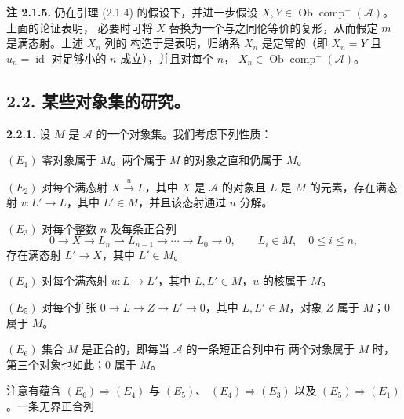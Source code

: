 \clearpage
{}%
\begingroup\small\setlength{\parskip}{0pt}\setlength{\emergencystretch}{1.5em}
\setlength{\abovedisplayskip}{4pt plus 2pt minus 2pt}%
\setlength{\belowdisplayskip}{4pt plus 2pt minus 2pt}%

\noindent\textbf{注 2.1.5.}\quad
仍在引理 (2.1.4) 的假设下，并进一步假设
$X,Y\in\operatorname{Ob}\operatorname{comp}^{-}(\mathcal A)$。上面的论证表明，
必要时可将 $X$ 替换为一个与之同伦等价的复形，从而假定 $m$ 是满态射。上述 $X_n$ 列的
构造于是表明，归纳系 $X_n$ 是定常的（即 $X_n=Y$ 且
$u_n=\operatorname{id}$ 对足够小的 $n$ 成立），并且对每个 $n$，
$X_n\in\operatorname{Ob}\operatorname{comp}^{-}(\mathcal A)$。

\subsection*{2.2. 某些对象集的研究。}

\noindent\textbf{2.2.1.}\quad
设 $M$ 是 $\mathcal A$ 的一个对象集。我们考虑下列性质：

\noindent $(E_1)$ 零对象属于 $M$。两个属于 $M$ 的对象之直和仍属于 $M$。

\noindent $(E_2)$ 对每个满态射 $X\xrightarrow{u}L$，其中 $X$ 是
$\mathcal A$ 的对象且 $L$ 是 $M$ 的元素，存在满态射
$v\colon L'\longrightarrow L$，其中 $L'\in M$，并且该态射通过 $u$ 分解。

\noindent $(E_3)$ 对每个整数 $n$ 及每条正合列
\[
0\longrightarrow X\longrightarrow L_n\longrightarrow L_{n-1}
\longrightarrow\cdots\longrightarrow L_0\longrightarrow0,
\qquad L_i\in M,\quad 0\le i\le n,
\]
存在满态射 $L'\longrightarrow X$，其中 $L'\in M$。

\noindent $(E_4)$ 对每个满态射 $u\colon L\longrightarrow L'$，其中
$L,L'\in M$，$u$ 的核属于 $M$。

\noindent $(E_5)$ 对每个扩张
$0\longrightarrow L\longrightarrow Z\longrightarrow L'\longrightarrow0$，其中
$L,L'\in M$，对象 $Z$ 属于 $M$；$0$ 属于 $M$。

\noindent $(E_6)$ 集合 $M$ 是正合的，即每当 $\mathcal A$ 的一条短正合列中有
两个对象属于 $M$ 时，第三个对象也如此；$0$ 属于 $M$。

注意有蕴含 $(E_6)\Rightarrow(E_4)$ 与 $(E_5)$、
$(E_4)\Rightarrow(E_3)$ 以及 $(E_5)\Rightarrow(E_1)$。一条无界正合列

